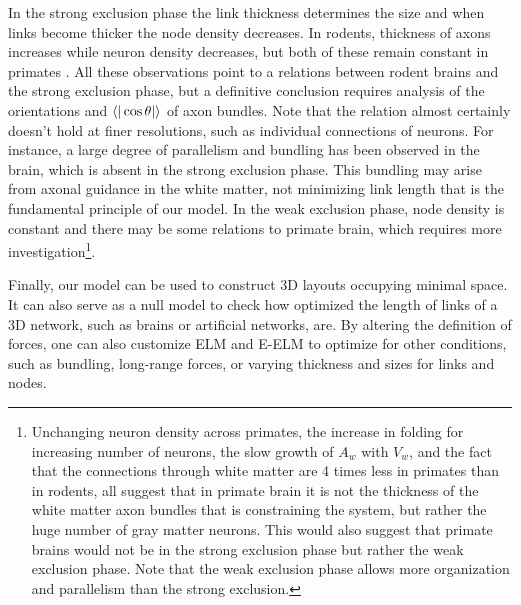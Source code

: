 \documentclass[nofootinbib,preprint,floatfix,endfloats]{revtex4} %
\begin{document}
In the strong exclusion phase the link thickness determines the size and when links become thicker the node density decreases. 
In rodents, thickness of axons increases while neuron density decreases, but both of these remain constant in primates \cite{herculano2012remarkable}. 
All these observations point to a relations between rodent brains and the strong exclusion phase, but a definitive conclusion requires analysis of the orientations and $\be{|\cos\theta|}$ of axon bundles.%
Note that the relation almost certainly doesn't hold at finer resolutions, such as individual connections of neurons. 
For instance, a large degree of parallelism and bundling has been observed in the brain\cite{le2001diffusion,assaf2008diffusion}, which is absent in the strong exclusion phase. This bundling may arise from axonal guidance in the white matter, not minimizing link length that is the fundamental principle of our model.
In the weak exclusion phase, node density is constant and there may be some relations to primate brain, which requires more investigation\footnote{
Unchanging neuron density across primates, the increase in folding for increasing number of neurons, the slow growth of $A_w$ with $V_w$, and the fact that the connections through white matter are 4 times less in primates than in rodents\cite{herculano2012remarkable}, all suggest that in primate brain it is not the thickness of the white matter axon bundles that is constraining the system, but rather the huge number of gray matter neurons. 
This would also suggest that primate brains would not be in the strong exclusion phase but rather the weak exclusion phase. Note that the weak exclusion phase allows more organization and parallelism than the strong exclusion.}.


Finally, our model can be used to construct 3D layouts occupying minimal space. 
It can also serve  as a null model to check how optimized the length of links of a 3D network, such as brains or artificial networks, are. 
By altering the definition  of forces, one can also customize ELM and E-ELM to optimize for other conditions, such as bundling, long-range forces, or varying thickness and sizes for links and nodes. 



\newpage
\newpage
\end{document}
